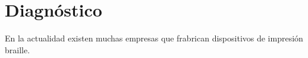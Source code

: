 \chapter{Diagn\'ostico}




En la actualidad existen muchas empresas que frabrican dispositivos de
impresi\'on braille.
